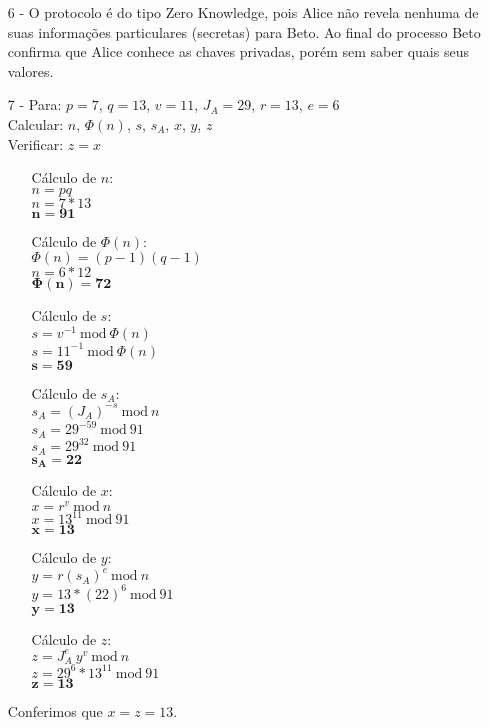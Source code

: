 \documentclass[12pt]{article}
\newcommand{\modd}{\ \text{mod}\ }
\begin{document}
\begin{itemize}
			\item[6 -]
				O protocolo é do tipo Zero Knowledge, pois Alice não revela
				nenhuma de suas informações particulares (secretas) para Beto.
				Ao final do processo Beto confirma que Alice conhece as chaves
				privadas, porém sem saber quais seus valores.
			\item[7 -]
				Para: $p = 7$, $q = 13$, $v = 11$, $J_A = 29$, $r = 13$, $e = 6$\\
				Calcular: $n$, $\Phi(n)$, $s$, $s_A$, $x$, $y$, $z$\\
				Verificar: $z = x$
				\begin{center}
					\begin{itemize}
						\item[]
							Cálculo de $n$:\\
							$n = pq$\\
							$n = 7*13$\\
							$\mathbf{n = 91}$
						\item[]
							Cálculo de $\Phi(n)$:\\
							$\Phi(n) = (p-1)(q-1)$\\
							$n = 6*12$\\
							$\mathbf{\Phi(n) = 72}$
						\item[]
							Cálculo de $s$:\\
							$s = v^{-1} \modd \Phi(n)$\\
							$s = 11^{-1} \modd \Phi(n)$\\
							$\mathbf{s  = 59}$
						\newpage	
						\item[]
							Cálculo de $s_A$:\\
							$s_A = (J_A)^{-s} \modd n$\\
							$s_A = 29^{-59} \modd 91$\\
							$s_A = 29^{32} \modd 91$\\							
							$\mathbf{s_A  = 22}$
						\item[]
							Cálculo de $x$:\\
							$x = r^{v} \modd n$\\
							$x = 13^{11} \modd 91$\\						
							$\mathbf{x  = 13}$
						\item[]
							Cálculo de $y$:\\
							$y = r(s_A)^{e} \modd n$\\
							$y = 13*(22)^{6} \modd 91$\\						
							$\mathbf{y  = 13}$
						\item[]
							Cálculo de $z$:\\
							$z = J_A^{e} \ y^{v} \modd n$\\
							$z = 29^{6} * 13^{11} \modd 91$\\						
							$\mathbf{z  = 13}$
					\end{itemize}	
				 \end{center}
			Conferimos que $x = z = 13$.	 
		\end{itemize}																		
\end{document}
